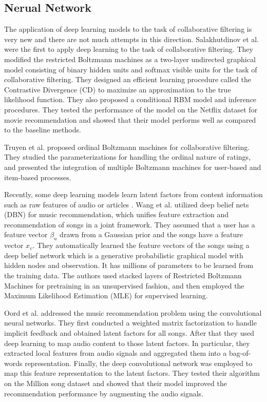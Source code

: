 \documentclass{sig-alternate-05-2015}
\begin{document}
\subsection{Nerual Network}
The application of deep learning models to the task of collaborative filtering
is very new and there are not much attempts in this direction.
Salakhutdinov et al. \cite{salakhutdinov2007restricted} were the first to apply deep learning to the task of collaborative filtering.
They modified the restricted Boltzmann machines as a two-layer undirected graphical model
consisting of binary hidden units and softmax visible units for the task of collaborative filtering.
They designed an efficient learning procedure called the Contrastive Divergence (CD) to
maximize an approximation to the true likelihood function.
They also proposed a conditional RBM model and inference procedures.
They tested the performance of the model on the Netflix dataset for movie recommendation
and showed that their model performs well as compared to the baseline methods.

Truyen et al. \cite{phung2009ordinal} proposed ordinal Boltzmann machines for collaborative filtering.
They studied the parameterizations for handling the ordinal nature of ratings,
and presented the integration of multiple Boltzmann machines for user-based and item-based processes.

Recently, some deep learning models learn latent factors from content information
such as raw features of audio or articles \cite{hu2014deep, ouyang2014autoencoder}.
Wang et al. \cite{wang2014improving} utilized deep belief nets (DBN) for music recommendation,
which unifies feature extraction and recommendation of songs in a joint framework.
They assumed that a user has a feature vector $\beta_u$ drawn from a Gaussian prior
and the songs have a feature vector $x_v$.
They automatically learned the feature vectors of the songs using a deep belief network
which is a generative probabilistic graphical model with hidden nodes and observation.
It has millions of parameters to be learned from the training data.
The authors used stacked layers of Restricted Boltzmann Machines
for pretraining in an unsupervised fashion, and then employed
the Maximum Likelihood Estimation (MLE) for supervised learning.

Oord et al. \cite{van2013deep} addressed the music recommendation problem
using the convolutional neural networks.
They first conducted a weighted matrix factorization to handle implicit feedback
and obtained latent factors for all songs.
After that they used deep learning to map audio content to those latent factors.
In particular, they extracted local features from audio signals and
aggregated them into a bag-of-words representation.
Finally, the deep convolutional network was employed to map this feature representation
to the latent factors.
They tested their algorithm on the Million song dataset and
showed that their model improved the recommendation performance by augmenting the audio signals.
\end{document}
